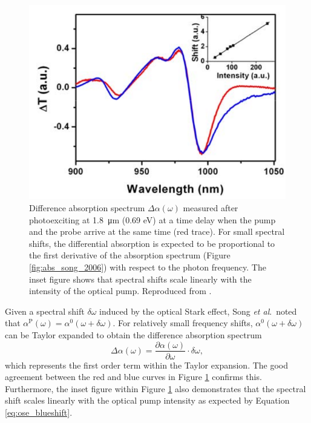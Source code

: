 \begin{figure}[ht]
	\centering
	\includegraphics[scale=0.4]{images/chapter_prior_works/dtt_song_2006}
	\caption{Difference absorption spectrum $\Delta \alpha(\omega)$ measured after photoexciting at \SI{1.8}{\um} (0.69 eV) at a time delay when the pump and the probe arrive at the same time (red trace). For small spectral shifts, the differential absorption is expected to be proportional to the first derivative of the absorption spectrum (Figure \ref{fig:abs_song_2006}) with respect to the photon frequency. The inset figure shows that spectral shifts scale linearly with the intensity of the optical pump. Reproduced from \cite{song2006optical}.}
	\label{fig:dtt_song_2006}
\end{figure}

Given a spectral shift $\delta \omega$ induced by the optical Stark effect, Song \textit{et al}.\ noted that $\alpha^\text{P}(\omega) = \alpha^0 (\omega + \delta \omega)$. For relatively small frequency shifts, $\alpha^0 (\omega + \delta \omega)$ can be Taylor expanded to obtain the difference absorption spectrum
\begin{equation}
	\Delta \alpha(\omega) = \frac{\partial \alpha(\omega)}{\partial \omega} \cdot \delta\omega,
\end{equation}
which represents the first order term within the Taylor expansion. The good agreement between the red and blue curves in Figure \ref{fig:dtt_song_2006} confirms this. Furthermore, the inset figure within Figure \ref{fig:dtt_song_2006} also demonstrates that the spectral shift scales linearly with the optical pump intensity as expected by Equation \eqref{eq:ose_blueshift}.




